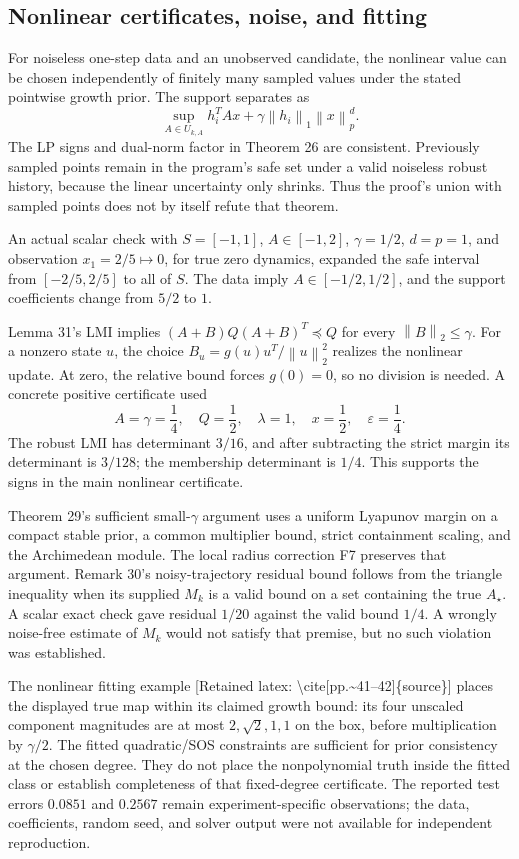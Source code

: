 \documentclass[10pt]{article}
\begin{document}
\subsection*{Nonlinear certificates, noise, and fitting}
For noiseless one-step data and an unobserved candidate, the nonlinear value can be chosen independently of finitely many sampled values under the stated pointwise growth prior. The support separates as \[\sup_{A\in U_{k,A}}h_i^TAx+
 \gamma\left\lVert h_i\right\rVert_1\left\lVert x\right\rVert_p^d.\] The LP signs and dual-norm factor in Theorem 26 are consistent. Previously sampled points remain in the program’s safe set under a valid noiseless robust history, because the linear uncertainty only shrinks. Thus the proof’s union with sampled points does not by itself refute that theorem.\par
An actual scalar check with \(S=[-1,1]\), \(A\in[-1,2]\), \(\gamma=1/2\), \(d=p=1\), and observation \(x_1=2/5\mapsto0\), for true zero dynamics, expanded the safe interval from \([-2/5,2/5]\) to all of \(S\). The data imply \(A\in[-1/2,1/2]\), and the support coefficients change from \(5/2\) to \(1\).\par
Lemma 31’s LMI implies \((A+B)Q(A+B)^T\preceq Q\) for every \(\left\lVert B\right\rVert_2\le\gamma\). For a nonzero state \(u\), the choice \(B_u=g(u)u^T/\left\lVert u\right\rVert_2^2\) realizes the nonlinear update. At zero, the relative bound forces \(g(0)=0\), so no division is needed. A concrete positive certificate used \[A=\gamma=\frac14,\quad Q=\frac12,\quad
 \lambda=1,\quad x=\frac12,\quad\varepsilon=\frac14.\] The robust LMI has determinant \(3/16\), and after subtracting the strict margin its determinant is \(3/128\); the membership determinant is \(1/4\). This supports the signs in the main nonlinear certificate.\par
Theorem 29’s sufficient small-\(\gamma\) argument uses a uniform Lyapunov margin on a compact stable prior, a common multiplier bound, strict containment scaling, and the Archimedean module. The local radius correction F7 preserves that argument. Remark 30’s noisy-trajectory residual bound follows from the triangle inequality when its supplied \(M_k\) is a valid bound on a set containing the true \(A_\star\). A scalar exact check gave residual \(1/20\) against the valid bound \(1/4\). A wrongly noise-free estimate of \(M_k\) would not satisfy that premise, but no such violation was established.\par
The nonlinear fitting example [Retained latex: \textbackslash{}cite[pp.\textasciitilde{}41--42]\{source\}] places the displayed true map within its claimed growth bound: its four unscaled component magnitudes are at most \(2,\sqrt2,1,1\) on the box, before multiplication by \(\gamma/2\). The fitted quadratic/SOS constraints are sufficient for prior consistency at the chosen degree. They do not place the nonpolynomial truth inside the fitted class or establish completeness of that fixed-degree certificate. The reported test errors \(0.0851\) and \(0.2567\) remain experiment-specific observations; the data, coefficients, random seed, and solver output were not available for independent reproduction.\par
\end{document}
